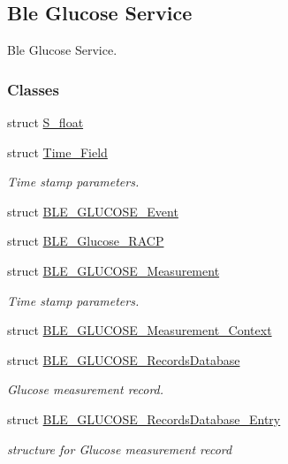 \hypertarget{group___b_l_e___g_s}{}\subsection{Ble Glucose Service}
\label{group___b_l_e___g_s}


Ble Glucose Service.  


\subsubsection*{Classes}
\begin{DoxyCompactItemize}
\item 
struct \hyperlink{struct_s__float}{S\+\_\+float}
\item 
struct \hyperlink{struct_time___field}{Time\+\_\+\+Field}
\begin{DoxyCompactList}\small\item\em Time stamp parameters. \end{DoxyCompactList}\item 
struct \hyperlink{struct_b_l_e___g_l_u_c_o_s_e___event}{B\+L\+E\+\_\+\+G\+L\+U\+C\+O\+S\+E\+\_\+\+Event}
\item 
struct \hyperlink{struct_b_l_e___glucose___r_a_c_p}{B\+L\+E\+\_\+\+Glucose\+\_\+\+R\+A\+CP}
\item 
struct \hyperlink{struct_b_l_e___g_l_u_c_o_s_e___measurement}{B\+L\+E\+\_\+\+G\+L\+U\+C\+O\+S\+E\+\_\+\+Measurement}
\begin{DoxyCompactList}\small\item\em Time stamp parameters. \end{DoxyCompactList}\item 
struct \hyperlink{struct_b_l_e___g_l_u_c_o_s_e___measurement___context}{B\+L\+E\+\_\+\+G\+L\+U\+C\+O\+S\+E\+\_\+\+Measurement\+\_\+\+Context}
\item 
struct \hyperlink{struct_b_l_e___g_l_u_c_o_s_e___records_database}{B\+L\+E\+\_\+\+G\+L\+U\+C\+O\+S\+E\+\_\+\+Records\+Database}
\begin{DoxyCompactList}\small\item\em Glucose measurement record. \end{DoxyCompactList}\item 
struct \hyperlink{struct_b_l_e___g_l_u_c_o_s_e___records_database___entry}{B\+L\+E\+\_\+\+G\+L\+U\+C\+O\+S\+E\+\_\+\+Records\+Database\+\_\+\+Entry}
\begin{DoxyCompactList}\small\item\em structure for Glucose measurement record \end{DoxyCompactList}\end{DoxyCompactItemize}
